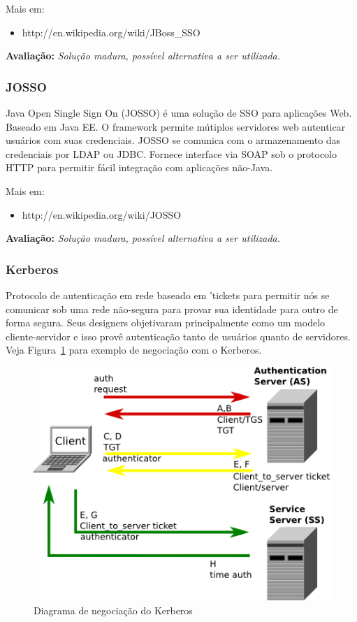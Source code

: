 \documentclass[11pt]{article}
\begin{document}
Mais em:
\begin{itemize}
  \item{http://en.wikipedia.org/wiki/JBoss\_SSO}
\end{itemize}

{\bf Avaliação:} {\it Solução madura, possível alternativa a ser utilizada.}

\subsubsection{JOSSO}

Java Open Single Sign On (JOSSO) é uma solução de SSO para aplicações Web.
Baseado em Java EE. O framework permite mútiplos servidores web autenticar
usuários com suas credenciais. JOSSO se comunica com o armazenamento das
credenciais por LDAP ou JDBC. Fornece interface via SOAP sob o protocolo HTTP
para permitir fácil integração com aplicações não-Java.

Mais em:
\begin{itemize}
  \item{http://en.wikipedia.org/wiki/JOSSO}
\end{itemize}

{\bf Avaliação:} {\it Solução madura, possível alternativa a ser utilizada.}

\subsubsection{Kerberos}

Protocolo de autenticação em rede baseado em 'tickets para permitir nós se
comunicar sob uma rede não-segura para provar sua identidade para outro de
forma segura. Seus designers objetivaram principalmente como um modelo
cliente-servidor e isso provê autenticação tanto de usuários quanto de
servidores. Veja Figura~\ref{fig:kerberos} para exemplo de negociação com o
Kerberos.

\begin{figure}[h]
\center
\includegraphics[scale=0.6]{kerberos.png}
\caption{Diagrama de negociação do Kerberos}
\label{fig:kerberos}
\end{figure}
\end{document}
